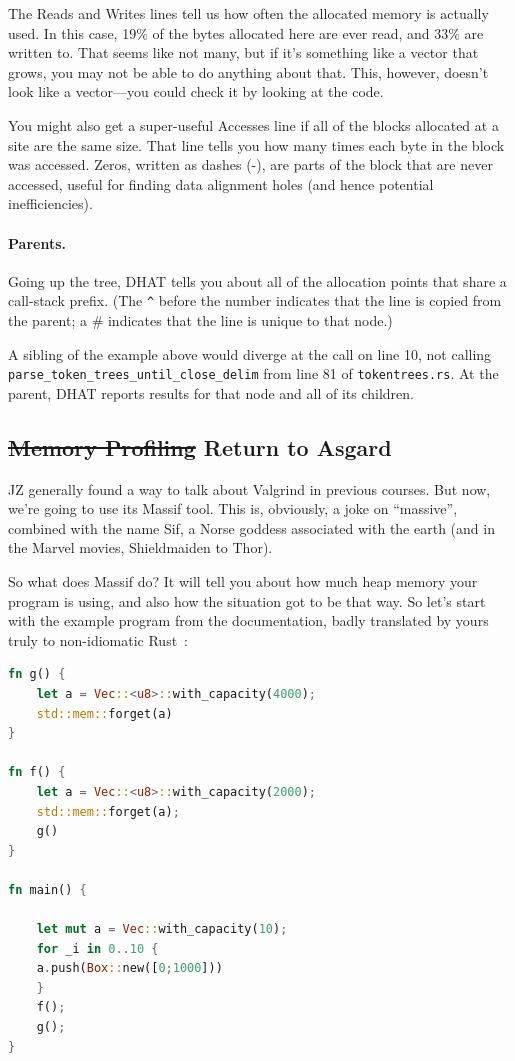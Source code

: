 \documentclass[a4paper]{report}
\begin{document}
The Reads and Writes lines tell us how often the allocated memory is actually used. In this case,
19\% of the bytes allocated here are ever read, and 33\% are written to. That seems like not many, but if it's something
like a vector that grows, you may not be able to do anything about that. This, however, doesn't look like a vector---you
could check it by looking at the code.

You might also get a super-useful Accesses line if all of the blocks allocated at a site are the same size.
That line tells you how many times each byte in the block was accessed. Zeros, written as dashes (-), are
parts of the block that are never accessed, useful for finding data alignment holes (and hence potential
inefficiencies).

\paragraph{Parents.} Going up the tree, DHAT tells you about all of the allocation points that share a call-stack
prefix. (The \verb+^+ before the number indicates that the line is copied from the parent; a \# indicates that the line is unique to
that node.)

A sibling of the example above would diverge at the call on line 10, not calling
\texttt{parse\_token\_trees\_until\_close\_delim} from line 81 of \texttt{tokentrees.rs}. At the parent, DHAT
reports results for that node and all of its children.

\subsection*{\st{Memory Profiling} Return to Asgard}
JZ generally found a way to talk about Valgrind in previous courses. But now, we're going to use its Massif tool. This is, obviously, a joke on ``massive'', combined with the name Sif, a Norse goddess associated with the earth (and in the Marvel movies, Shieldmaiden to Thor).

So what does Massif do? It will tell you about how much heap memory your program is using, and also how the situation got to be that way. So let's start with the example program from the documentation, badly translated by yours truly to non-idiomatic Rust~\cite{massif}:


\begin{lstlisting}[language=Rust]
fn g() {
    let a = Vec::<u8>::with_capacity(4000);
    std::mem::forget(a)
}

fn f() {
    let a = Vec::<u8>::with_capacity(2000);
    std::mem::forget(a);
    g()
}

fn main() {

    let mut a = Vec::with_capacity(10);
    for _i in 0..10 {
	a.push(Box::new([0;1000]))
    }
    f();
    g();
}
\end{lstlisting}
\end{document}
